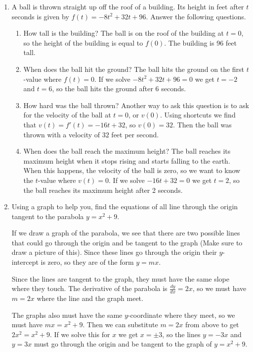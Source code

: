 \documentclass[11pt]{article}
\begin{document}
\begin{enumerate}
\item A ball is thrown straight up off the roof of a building.  Its
  height in feet after $t$ seconds is given by
  $f(t)=-8t^2+32t+96$. Answer the following questions.
  \begin{enumerate}
  \item How tall is the building?
    \vfill
    {\color{blue}
      The ball is on the roof of the building at $t = 0$, so the
      height of the building is equal to $f(0)$.  The building is 96
      feet tall.
    }
    \vfill
    \newpage
  \item When does the ball hit the ground?
    \vfill
    {\color{blue}
      The ball hits the ground on the first $t$-value where $f(t)=0$.
      If we solve $-8t^2+32t+96 = 0$ we get $t=-2$ and $t=6$, so the
      ball hits the ground after 6 seconds.
    }
    \vfill
  \item How hard was the ball thrown?
    \vfill
    {\color{blue}
      Another way to ask this question is to ask for the velocity of
      the ball at $t=0$, or $v(0)$.  Using shortcuts we find that
      $v(t) = f'(t) = -16t+32$, so $v(0) = 32$.  Then the ball was
      thrown with a velocity of $32$ feet per second.
    }
    \vfill
  \item When does the ball reach the maximum height?  \vfill
    {\color{blue} 
      The ball reaches its maximum height when it stops rising and
      starts falling to the earth.  When this happens, the velocity of
      the ball is zero, so we want to know the $t$-value where $v(t) =
      0$.  If we solve $-16t+32 = 0$ we get $t=2$, so the ball reaches
      its maximum height after 2 seconds.
    }
    \vfill
  \end{enumerate}
  
  \newpage

\item Using a graph to help you, find the equations of all line
  through the origin tangent to the parabola $y = x^2 + 9$.
    \vfill
    {\color{blue}

      If we draw a graph of the parabola, we see that there are two
      possible lines that could go through the origin and be tangent
      to the graph (Make sure to draw a picture of this).  Since these
      lines go through the origin their $y$-intercept is zero, so they
      are of the form $y=mx$.

      Since the lines are tangent to the graph, they must have the
      same slope where they touch.  The derivative of the parabola is
      $\frac{dy}{dx} = 2x$, so we must have $m=2x$ where the line and
      the graph meet.

      The graphs also must have the same $y$-coordinate where they
      meet, so we must have $mx=x^2+9$.  Then we can substitute $m=2x$
      from above to get $2x^2=x^2+9$.  If we solve this for $x$ we get
      $x=\pm 3$, so the lines $y=-3x$ and $y=3x$ must go through the
      origin and be tangent to the graph of $y=x^2+9$.
      
    }
    \vfill


\end{enumerate}  
\end{document}
